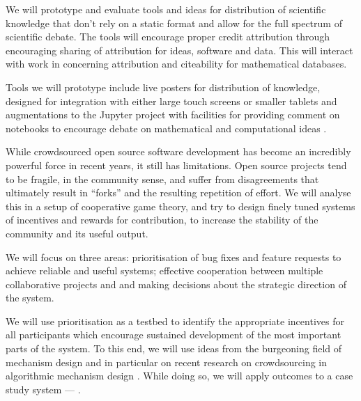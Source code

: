 \begin{workpackage}[id=social-aspects,wphases=0-48,
  title=Social Aspects,
  lead=UO,
  UORM=23,USHRM=18,USORM=6]
\begin{tasklist}
\begin{task}[title=Implications of VREs for Publication,id=social-output,lead=USH,PM=12,partners={UO}]
  We will prototype and evaluate tools and ideas for distribution of
  scientific knowledge that don't rely on a static format and allow
  for the full spectrum of scientific debate.  The tools will
  encourage proper credit attribution through encouraging sharing of
  attribution for ideas, software and data. This will interact with
  work in  concerning attribution and citeability for
  mathematical databases.

  Tools we will prototype include live posters for distribution of
  knowledge, designed for integration with either large touch screens
  or smaller tablets  and augmentations
  to the Jupyter project with facilities for providing comment on
  notebooks to encourage debate on mathematical and computational
  ideas .
\end{task}


\begin{task}[title=Mechanism Design for free software development,PM=15,lead=UO,
id=isocial-decisionmaking]

While crowdsourced open source software development has become an
incredibly powerful force in recent years, it still has limitations. 
Open source projects tend to be fragile, in the community sense, and
suffer from disagreements that ultimately result in ``forks'' and the
resulting repetition of effort. We will analyse this in a setup of
cooperative game theory, and try to design finely tuned systems of
incentives and rewards for contribution, to increase the stability of
the community and its useful output.

We will focus on three areas: prioritisation of bug fixes and feature
requests to achieve reliable and useful systems; effective cooperation between multiple collaborative
projects and and making decisions about
the strategic direction of the system.  

We will use prioritisation as a testbed to identify the appropriate incentives for all
participants which encourage sustained development
of the most important parts of the system.
To this end, we will use
ideas from the burgeoning field of mechanism design \cite{AGTbook} and
in particular on recent research on crowdsourcing in algorithmic
mechanism design \cite{crowds}.  While doing so, we will apply
outcomes to a case study system --- \Sage.  


\end{task}
\end{tasklist}
\end{workpackage}
